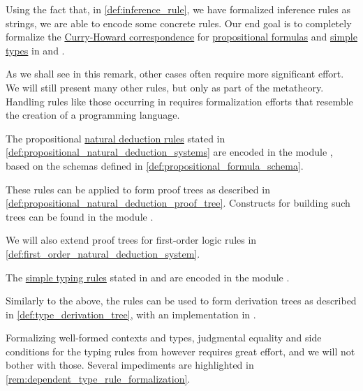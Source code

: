 \begin{remark}\label{rem:inference_rule_formalization}
  Using the fact that, in \cref{def:inference_rule}, we have formalized inference rules as strings, we are able to encode some concrete rules. Our end goal is to completely formalize the \hyperref[con:curry_howard_correspondence]{Curry-Howard correspondence} for \hyperref[def:propositional_syntax/formula]{propositional formulas} and \hyperref[def:simple_type]{simple types} in  and .

  As we shall see in this remark, other cases often require more significant effort. We will still present many other rules, but only as part of the metatheory. Handling rules like those occurring in  requires formalization efforts that resemble the creation of a programming language.

  \begin{itemize}
     The propositional \hyperref[def:natural_deduction_rule]{natural deduction rules} stated in \cref{def:propositional_natural_deduction_systems} are encoded in the module , based on the schemas defined in \cref{def:propositional_formula_schema}.

    These rules can be applied to form proof trees as described in \cref{def:propositional_natural_deduction_proof_tree}. Constructs for building such trees can be found in the module .

    We will also extend proof trees for first-order logic rules in \cref{def:first_order_natural_deduction_system}.

     The \hyperref[def:simple_typing_rule]{simple typing rules} stated in  and  are encoded in the module .

    Similarly to the above, the rules can be used to form derivation trees as described in \cref{def:type_derivation_tree}, with an implementation in .

    Formalizing well-formed contexts and types, judgmental equality and side conditions for the typing rules from  however requires great effort, and we will not bother with those. Several impediments are highlighted in \cref{rem:dependent_type_rule_formalization}.
  \end{itemize}
\end{remark}

